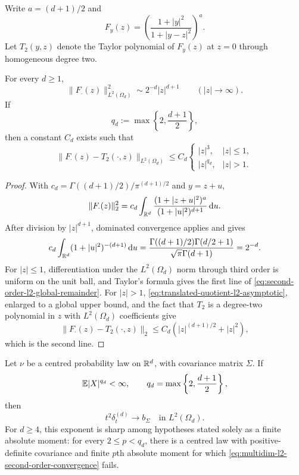 Write \(a=(d+1)/2\) and
\[
 F_y(z)=\left(\frac{1+|y|^2}{1+|y-z|^2}\right)^a.
\]
Let \(T_2(y,z)\) denote the Taylor polynomial of \(F_y(z)\) at \(z=0\)
through homogeneous degree two.

\begin{lemma}
\label{lem:multidim-large-translation-l2-growth}
For every \(d\ge1\),
\begin{equation}\label{eq:translated-quotient-l2-asymptotic}
 \|F_\cdot(z)\|_{L^2(\Omega_d)}^2
 \sim2^{-d}|z|^{d+1}\qquad(|z|\to\infty).
\end{equation}
If
\[
 q_d:=\max\left\{2,\frac{d+1}{2}\right\},
\]
then a constant \(C_d\) exists such that
\begin{equation}\label{eq:second-order-l2-global-remainder}
 \|F_\cdot(z)-T_2(\cdot,z)\|_{L^2(\Omega_d)}
 \le C_d
 \begin{cases}|z|^3,&|z|\le1,\\ |z|^{q_d},&|z|>1.
 \end{cases}
\end{equation}
\end{lemma}

\begin{proof}
With \(c_d=\Gamma((d+1)/2)/\pi^{(d+1)/2}\) and \(y=z+u\),
\[
 \|F_\cdot(z)\|_2^2
 =c_d\int_{\mathbb{R}^d}
 \frac{(1+|z+u|^2)^a}{(1+|u|^2)^{d+1}}\,\mathrm{d} u.
\]
After division by \(|z|^{d+1}\), dominated convergence applies and gives
\[
 c_d\int_{\mathbb{R}^d}(1+|u|^2)^{-(d+1)}\,\mathrm{d} u
 =\frac{\Gamma((d+1)/2)\Gamma(d/2+1)}
 {\sqrt\pi\Gamma(d+1)}=2^{-d}.
\]
For \(|z|\le1\), differentiation under the \(L^2(\Omega_d)\) norm through
third order is uniform on the unit ball, and Taylor's formula gives the
first line of \eqref{eq:second-order-l2-global-remainder}.  For \(|z|>1\),
\eqref{eq:translated-quotient-l2-asymptotic}, enlarged to a global upper
bound, and the fact that \(T_2\) is a degree-two polynomial in \(z\) with
\(L^2(\Omega_d)\) coefficients give
\[
 \|F_\cdot(z)-T_2(\cdot,z)\|_2
 \le C_d(|z|^{(d+1)/2}+|z|^2),
\]
which is the second line.
\end{proof}

\begin{theorem}
\label{thm:multidim-l2-moment-threshold}
Let \(\nu\) be a centred probability law on \(\mathbb{R}^d\), with covariance
matrix \(\Sigma\).  If
\begin{equation}\label{eq:multidim-qd-moment}
 \mathbb{E}|X|^{q_d}<\infty,
 \qquad q_d=\max\left\{2,\frac{d+1}{2}\right\},
\end{equation}
then
\begin{equation}\label{eq:multidim-l2-second-order-convergence}
 t^2\delta_t^{(d)}\longrightarrow b_\Sigma
 \quad\text{in }L^2(\Omega_d).
\end{equation}
For \(d\ge4\), this exponent is sharp among hypotheses stated solely as a
finite absolute moment: for every \(2\le p<q_d\), there is a centred law
with positive-definite covariance and finite \(p\)th absolute moment for
which \eqref{eq:multidim-l2-second-order-convergence} fails.
\end{theorem}

